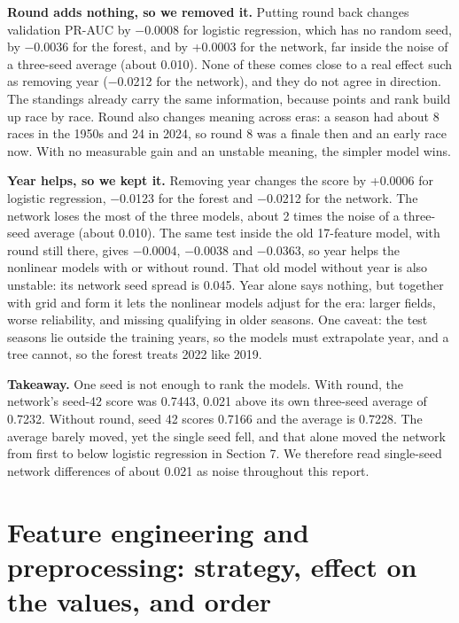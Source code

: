 \documentclass[10pt,a4paper]{article}
\begin{document}
\textbf{Round adds nothing, so we removed it.} Putting round back changes validation PR-AUC by $-$0.0008 for logistic regression, which has no random seed, by $-$0.0036 for the forest, and by +0.0003 for the network, far inside the noise of a three-seed average (about 0.010). None of these comes close to a real effect such as removing year ($-$0.0212 for the network), and they do not agree in direction. The standings already carry the same information, because points and rank build up race by race. Round also changes meaning across eras: a season had about 8 races in the 1950s and 24 in 2024, so round 8 was a finale then and an early race now. With no measurable gain and an unstable meaning, the simpler model wins.


\textbf{Year helps, so we kept it.} Removing year changes the score by +0.0006 for logistic regression, $-$0.0123 for the forest and $-$0.0212 for the network. The network loses the most of the three models, about 2 times the noise of a three-seed average (about 0.010). The same test inside the old 17-feature model, with round still there, gives $-$0.0004, $-$0.0038 and $-$0.0363, so year helps the nonlinear models with or without round. That old model without year is also unstable: its network seed spread is 0.045. Year alone says nothing, but together with grid and form it lets the nonlinear models adjust for the era: larger fields, worse reliability, and missing qualifying in older seasons. One caveat: the test seasons lie outside the training years, so the models must extrapolate year, and a tree cannot, so the forest treats 2022 like 2019.


\begin{takeaway}
\textbf{Takeaway.} One seed is not enough to rank the models. With round, the network's seed-42 score was 0.7443, 0.021 above its own three-seed average of 0.7232. Without round, seed 42 scores 0.7166 and the average is 0.7228. The average barely moved, yet the single seed fell, and that alone moved the network from first to below logistic regression in Section 7. We therefore read single-seed network differences of about 0.021 as noise throughout this report.
\end{takeaway}



\section{Feature engineering and preprocessing: strategy, effect on the values, and order}
\end{document}
